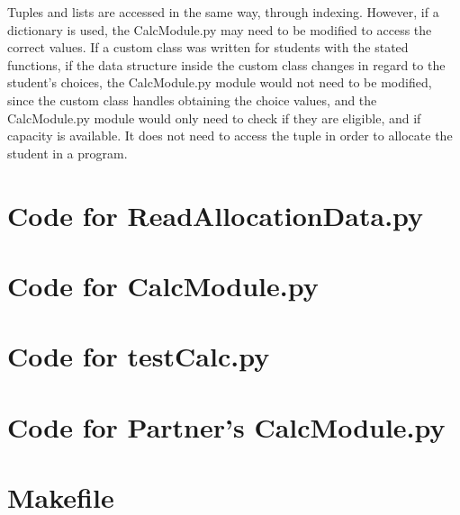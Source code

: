 \documentclass[12pt]{article}
\begin{document}
\begin{enumerate}[(a)]
Tuples and lists are accessed in the same way, through indexing. However, if a dictionary is used, the CalcModule.py may need to be modified to access the correct values. If a custom class was written for students with the stated functions, if the data structure inside the custom class changes in regard to the student's choices, the CalcModule.py module would not need to be modified, since the custom class handles obtaining the choice values, and the CalcModule.py module would only need to check if they are eligible, and if capacity is available. It does not need to access the tuple in order to allocate the student in a program.

\end{enumerate}

\newpage

\lstset{language=Python, basicstyle=\tiny, breaklines=true, showspaces=false,
  showstringspaces=false, breakatwhitespace=true}

\def\thesection{\Alph{section}}

\section{Code for ReadAllocationData.py}

\noindent 

\newpage

\section{Code for CalcModule.py}

\noindent 

\newpage

\section{Code for testCalc.py}

\noindent 

\newpage

\section{Code for Partner's CalcModule.py}

\noindent 

\newpage

\section{Makefile}

\lstset{language=make}
\noindent 
\end{document}
